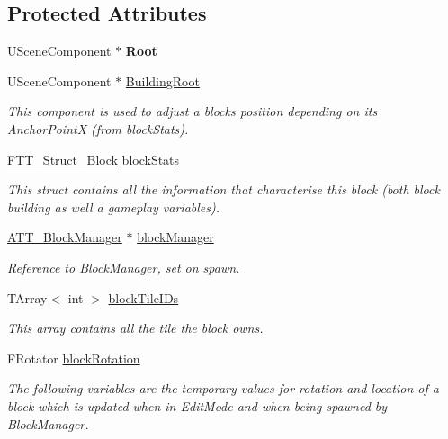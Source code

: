 \subsection*{Protected Attributes}
\begin{DoxyCompactItemize}
\item 
\mbox{\label{class_a_t_t___block_a40c6e6a4d5534649760267aef588d763}} 
U\+Scene\+Component $\ast$ {\bfseries Root}
\item 
U\+Scene\+Component $\ast$ \mbox{\hyperlink{class_a_t_t___block_a1be1a5aea523a1a265eb0751e16b12d7}{Building\+Root}}
\begin{DoxyCompactList}\small\item\em This component is used to adjust a block\textquotesingle{}s position depending on its Anchor\+PointX (from block\+Stats). \end{DoxyCompactList}\item 
\mbox{\hyperlink{struct_f_t_t___struct___block}{F\+T\+T\+\_\+\+Struct\+\_\+\+Block}} \mbox{\hyperlink{class_a_t_t___block_aecfe89c2093f6182e9e8f47ce19d6837}{block\+Stats}}
\begin{DoxyCompactList}\small\item\em This struct contains all the information that characterise this block (both block building as well a gameplay variables). \end{DoxyCompactList}\item 
\mbox{\hyperlink{class_a_t_t___block_manager}{A\+T\+T\+\_\+\+Block\+Manager}} $\ast$ \mbox{\hyperlink{class_a_t_t___block_ae6c7b24dcdb93d9b937ba9157d10e907}{block\+Manager}}
\begin{DoxyCompactList}\small\item\em Reference to Block\+Manager, set on spawn. \end{DoxyCompactList}\item 
T\+Array$<$ int $>$ \mbox{\hyperlink{class_a_t_t___block_a1400fda284071cdf74fbe6a6bd60b935}{block\+Tile\+I\+Ds}}
\begin{DoxyCompactList}\small\item\em This array contains all the tile the block owns. \end{DoxyCompactList}\item 
\mbox{\label{class_a_t_t___block_aaf28b260c7a2a851f96663788e67e3fb}} 
F\+Rotator \mbox{\hyperlink{class_a_t_t___block_aaf28b260c7a2a851f96663788e67e3fb}{block\+Rotation}}
\begin{DoxyCompactList}\small\item\em The following variables are the temporary values for rotation and location of a block which is updated when in Edit\+Mode and when being spawned by Block\+Manager. \end{DoxyCompactList}\item 

\end{DoxyCompactItemize}
